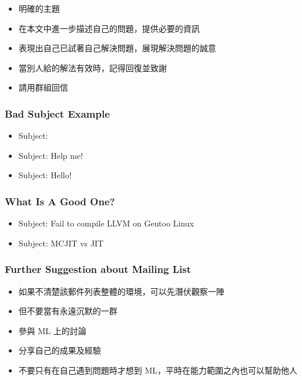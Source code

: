 \documentclass[CJK]{beamer}
\begin{document}
\begin{CJK}{UTF8}{bkai}
\begin{frame}
\begin{itemize}
  \item 明確的主題
  \item 在本文中進一步描述自己的問題，提供必要的資訊
  \item 表現出自己已試著自己解決問題，展現解決問題的誠意
  \item 當別人給的解法有效時，記得回復並致謝
  \item 請用群組回信
\end{itemize}

\end{frame}

\begin{frame}
  \frametitle{Bad Subject Example}

\begin{itemize}
  \item Subject:
  \item Subject: Help me!
  \item Subject: Hello!
\end{itemize}

\end{frame}

\begin{frame}
  \frametitle{What Is A Good One?}

\begin{itemize}
  \item Subject: Fail to compile LLVM on Gentoo Linux
  \item Subject: MCJIT vs JIT
\end{itemize}

\end{frame}

\begin{frame}
  \frametitle{Further Suggestion about Mailing List}

\begin{itemize}
  \item 如果不清楚該郵件列表整體的環境，可以先潛伏觀察一陣
  \item 但不要當有永遠沉默的一群
  \item 參與 ML 上的討論
  \item 分享自己的成果及經驗
  \item 不要只有在自己遇到問題時才想到 ML，平時在能力範圍之內也可以幫助他人
\end{itemize}


\end{frame}
\end{CJK}
\end{document}
